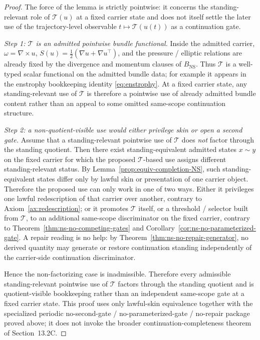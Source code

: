\begin{proof}
The force of the lemma is strictly pointwise: it concerns the standing-relevant role of
$\mathcal T(u)$ at a fixed carrier state and does not itself settle the later use of the trajectory-level
observable $t\mapsto \mathcal T(u(t))$ as a continuation gate.

\emph{Step 1: $\mathcal T$ is an admitted pointwise bundle functional.} Inside the admitted carrier,
$\omega=\nabla\times u$, $S(u)=\tfrac12(\nabla u+\nabla u^\top)$, and the pressure / elliptic relations are
already fixed by the divergence and momentum clauses of $B_{\mathrm{NS}}$. Thus $\mathcal T$ is a
well-typed scalar functional on the admitted bundle data; for example it appears in the enstrophy
bookkeeping identity \eqref{eq:enstrophy}. At a fixed carrier state, any standing-relevant use of
$\mathcal T$ is therefore a pointwise use of already admitted bundle content rather than an appeal to
some omitted same-scope continuation structure.

\emph{Step 2: a non-quotient-visible use would either privilege skin or open a second gate.}
Assume that a standing-relevant pointwise use of $\mathcal T$ does \emph{not} factor through the
standing quotient. Then there exist standing-equivalent admitted states $x\sim y$ on the fixed
carrier for which the proposed $\mathcal T$-based use assigns different standing-relevant status.
By Lemma~\ref{prop:equiv-completion-NS}, such standing-equivalent states differ only by lawful skin
or presentation of one carrier object. Therefore the proposed use can only work in one of two ways.
Either it privileges one lawful redescription of that carrier over another, contrary to
Axiom~\ref{ax:redescription}; or it promotes $\mathcal T$ itself, or a threshold / selector built
from $\mathcal T$, to an additional same-scope discriminator on the fixed carrier, contrary to
Theorem~\ref{thm:ns-no-competing-gates} and Corollary~\ref{cor:ns-no-parameterized-gate}. A repair
reading is no help: by Theorem~\ref{thm:ns-no-repair-generator}, no derived quantity may generate or
restore continuation standing independently of the carrier-side continuation discriminator.

Hence the non-factorizing case is inadmissible. Therefore every admissible standing-relevant
pointwise use of $\mathcal T$ factors through the standing quotient and is quotient-visible
bookkeeping rather than an independent same-scope gate at a fixed carrier state. This proof uses only
lawful-skin equivalence together with the specialized periodic no-second-gate / no-parameterized-gate /
no-repair package proved above; it does not invoke the broader continuation-completeness theorem of
Section~13.2C.
\end{proof}

